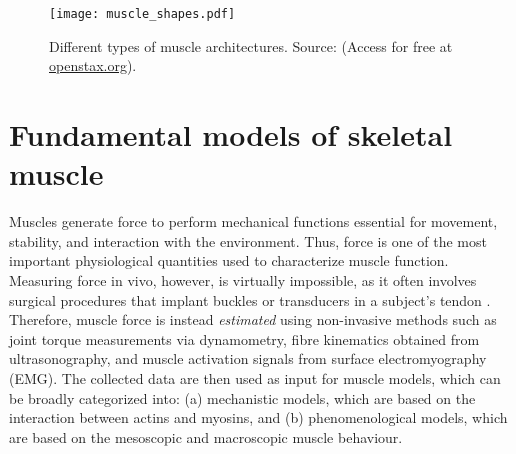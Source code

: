 \documentclass{sfuthesis}
\numberwithin{equation}{section}
\numberwithin{figure}{chapter}
\numberwithin{table}{chapter}
\theoremstyle{definition}
\begin{document}
\begin{figure}
    \centering
    \texttt{[image: muscle\_shapes.pdf]}
    \caption{Different types of muscle architectures. Source: \cite{AnatomyPhysiologyBook2022} (Access for free at \url{openstax.org}).\label{fig:muscle_architectures}}
\end{figure}

\section{Fundamental models of skeletal muscle}


Muscles generate force to perform mechanical functions essential for movement, stability, and interaction with the environment. Thus, force is one of the most important physiological quantities used to characterize muscle function. Measuring force in vivo, however, is virtually impossible, as it often involves surgical procedures that implant buckles or transducers in a subject's tendon \cite{Biewener1998KangarooRats,Komi1990}. Therefore, muscle force is instead \textit{estimated} using non-invasive methods such as joint torque measurements via dynamometry, fibre kinematics obtained from ultrasonography, and muscle activation signals from surface electromyography (EMG). The collected data are then used as input for muscle models, which can be broadly categorized into: (a) mechanistic models, which are based on the interaction between actins and myosins, and (b) phenomenological models, which are based on the mesoscopic and macroscopic muscle behaviour.
\end{document}

